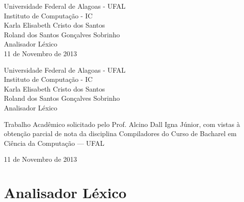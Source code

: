 \documentclass{article}
\author{Roland dos Santos Gonçalves Sobrinho}
\begin{document}


\begin{titlepage}
\vfill
\begin{center}
{\large Universidade Federal de Alagoas - UFAL}\\
{\large Instituto de Computação - IC}\\[5cm]
{\large Karla Elisabeth Cristo dos Santos}\\
{\large Roland dos Santos Gonçalves Sobrinho} \\[5cm]
{\Huge Analisador Léxico}\\[1cm]
\hspace{.45\textwidth} %
\vfill
11 de Novembro de 2013
\end{center}
\end{titlepage}



\begin{titlepage}
\vfill
\begin{center}
{\large Universidade Federal de Alagoas - UFAL}\\
{\large Instituto de Computação - IC}\\[5cm]
{\large Karla Elisabeth Cristo dos Santos}\\
{\large Roland dos Santos Gonçalves Sobrinho} \\[5cm]
{\Huge Analisador Léxico}\\[1cm]
\hspace{.45\textwidth} %
\begin{minipage}{.5\textwidth}
Trabalho Acadêmico solicitado pelo Prof. Alcino Dall Igna Júnior, com vistas à obtenção parcial de nota da disciplina Compiladores do Curso de Bacharel em Ciência da Computação — UFAL

\end{minipage}
\vfill
11 de Novembro de 2013
\end{center}
\end{titlepage}


\tableofcontents
\newpage





\section{Analisador Léxico}\label{Analisador Lexico}
\end{document}
